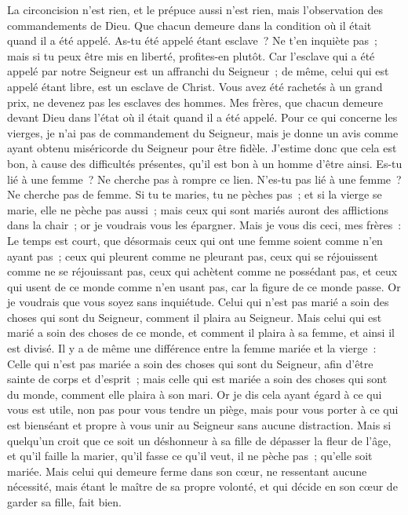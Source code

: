 \begin{multicols}{2}
La circoncision n'est rien, et le prépuce aussi n'est rien, mais l'observation des commandements de Dieu.
Que chacun demeure dans la condition où il était quand il a été appelé.
As-tu été appelé étant esclave~? Ne t'en inquiète pas~; mais si tu peux être mis en liberté, profites-en plutôt.
Car l'esclave qui a été appelé par notre Seigneur est un affranchi du Seigneur~; de même, celui qui est appelé étant libre, est un esclave de Christ.
Vous avez été rachetés à un grand prix, ne devenez pas les esclaves des hommes.
Mes frères, que chacun demeure devant Dieu dans l'état où il était quand il a été appelé.
Pour ce qui concerne les vierges, je n'ai pas de commandement du Seigneur, mais je donne un avis comme ayant obtenu miséricorde du Seigneur pour être fidèle.
J'estime donc que cela est bon, à cause des difficultés présentes, qu'il est bon à un homme d'être ainsi.
Es-tu lié à une femme~? Ne cherche pas à rompre ce lien. N'es-tu pas lié à une femme~? Ne cherche pas de femme.
Si tu te maries, tu ne pèches pas~; et si la vierge se marie, elle ne pèche pas aussi~; mais ceux qui sont mariés auront des afflictions dans la chair~; or je voudrais vous les épargner.
Mais je vous dis ceci, mes frères~: Le temps est court, que désormais ceux qui ont une femme soient comme n'en ayant pas~;
ceux qui pleurent comme ne pleurant pas, ceux qui se réjouissent comme ne se réjouissant pas, ceux qui achètent comme ne possédant pas,
et ceux qui usent de ce monde comme n'en usant pas, car la figure de ce monde passe.
Or je voudrais que vous soyez sans inquiétude. Celui qui n'est pas marié a soin des choses qui sont du Seigneur, comment il plaira au Seigneur.
Mais celui qui est marié a soin des choses de ce monde, et comment il plaira à sa femme, et ainsi il est divisé.
Il y a de même une différence entre la femme mariée et la vierge~: Celle qui n'est pas mariée a soin des choses qui sont du Seigneur, afin d'être sainte de corps et d'esprit~; mais celle qui est mariée a soin des choses qui sont du monde, comment elle plaira à son mari.
Or je dis cela ayant égard à ce qui vous est utile, non pas pour vous tendre un piège, mais pour vous porter à ce qui est bienséant et propre à vous unir au Seigneur sans aucune distraction.
Mais si quelqu'un croit que ce soit un déshonneur à sa fille de dépasser la fleur de l'âge, et qu'il faille la marier, qu'il fasse ce qu'il veut, il ne pèche pas~; qu'elle soit mariée.
Mais celui qui demeure ferme dans son cœur, ne ressentant aucune nécessité, mais étant le maître de sa propre volonté, et qui décide en son cœur de garder sa fille, fait bien.

\end{multicols}
